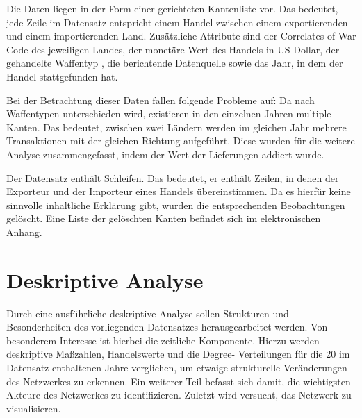\documentclass[a4paper,ngerman,oneside,titlepage,bibliography=totoc,11pt]{scrreprt}
\begin{document}
Die Daten liegen in der Form einer gerichteten Kantenliste vor. Das bedeutet, jede Zeile im Datensatz entspricht einem Handel zwischen einem exportierenden und einem importierenden Land. Zusätzliche Attribute sind der Correlates of War Code des jeweiligen Landes, der monetäre Wert des Handels in US Dollar, der gehandelte Waffentyp , die berichtende Datenquelle sowie das Jahr, in dem der Handel stattgefunden hat.

Bei der Betrachtung dieser Daten fallen folgende Probleme auf:
Da nach Waffentypen unterschieden wird, existieren in den einzelnen Jahren multiple Kanten. Das bedeutet, zwischen zwei Ländern werden im gleichen Jahr mehrere Transaktionen mit der gleichen Richtung aufgeführt. Diese wurden für die weitere Analyse zusammengefasst, indem der Wert der Lieferungen addiert wurde.

Der Datensatz enthält Schleifen. Das bedeutet, er enthält Zeilen, in denen der Exporteur und der Importeur eines Handels übereinstimmen. Da es hierfür keine sinnvolle inhaltliche Erklärung gibt, wurden die entsprechenden Beobachtungen gelöscht. Eine Liste der gelöschten Kanten befindet sich im elektronischen Anhang.

\chapter{Deskriptive Analyse}
Durch eine ausführliche deskriptive Analyse sollen Strukturen und Besonderheiten des vorliegenden Datensatzes herausgearbeitet werden. Von besonderem Interesse ist hierbei die zeitliche Komponente. Hierzu werden deskriptive Maßzahlen, Handelswerte und die Degree- Verteilungen für die 20 im Datensatz enthaltenen Jahre verglichen, um etwaige strukturelle Veränderungen des Netzwerkes zu erkennen.
Ein weiterer Teil befasst sich damit, die wichtigsten Akteure des Netzwerkes zu identifizieren. Zuletzt wird versucht, das Netzwerk zu visualisieren.
\end{document}
